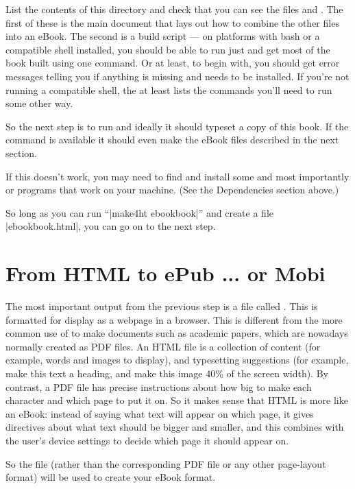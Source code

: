List the contents of this directory and check that you can see the
files  and . The first of these
is the main \tex document that lays out how to combine the other files
into an eBook.  The second is a build script --- on platforms with
bash or a compatible shell installed, you should be able to run just
 and get most of the book built using one
command. Or at least, to begin with, you should get error messages
telling you if anything is missing and needs to be installed. If you're not
running a compatible shell, the  at least lists
the commands you'll need to run some other way.

So the next step is to run  and ideally it should
typeset a copy of this book. If the  command is
available it should even make the eBook files described in the next
section.

If this doesn't work, you may need to find and install some
 and most importantly  or
 programs that work on your machine. (See the
Dependencies section above.)

So long as you can run ``\sverb|make4ht ebookbook|'' and create a file \sverb|ebookbook.html|,
you can go on to the next step.

\section{From HTML to ePub ... or Mobi}
\label{sec:html2epub}

The most important output from the previous step is a file called
.  This is formatted for display as a webpage
in a browser. This is different from the more common use of \tex to
make documents such as academic papers, which are nowadays normally
created as PDF files. An HTML file is a collection of content (for
example, words and images to display), and typesetting suggestions
(for example, make this text a heading, and make this image 40\% of
the screen width). By contrast, a PDF file has
precise instructions about how big to make each character and which
page to put it on. So it makes sense that HTML is more like an eBook:
instead of saying what text will appear on which page, it gives
directives about what text should be bigger and smaller, and this
combines with the user's device settings to decide which page it
should appear on.

So the  file (rather than the corresponding
PDF file or any other page-layout format) will be used to
create your eBook format. 

